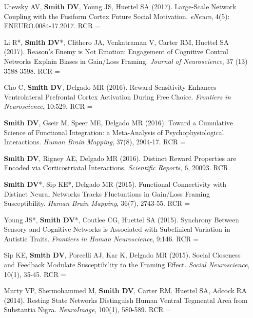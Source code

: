 \documentclass[11pt, letterpaper]{article}
\newcommand{\years}[1]{\marginnote{\scriptsize #1}}
\begin{document}
\begin{hangparas}{.5in}{1}

\years{24.}Utevsky AV, \textbf{Smith DV}, Young JS, Huettel SA (2017). Large-Scale Network Coupling with the Fusiform Cortex Future Social Motivation. \textit{eNeuro}, 4(5): ENEURO.0084-17.2017. RCR = 

\years{23.}Li R*, \textbf{Smith DV}*, Clithero JA, Venkatraman V, Carter RM, Huettel SA (2017). Reason’s Enemy is Not Emotion: Engagement of Cognitive Control Networks Explain Biases in Gain/Loss Framing. \textit{Journal of Neuroscience}, 37 (13) 3588-3598. RCR = 

\years{22.}Cho C, \textbf{Smith DV}, Delgado MR (2016). Reward Sensitivity Enhances Ventrolateral Prefrontal Cortex Activation During Free Choice. \textit{Frontiers in Neuroscience}, 10:529. RCR = 

\years{21.}\textbf{Smith DV}, Gseir M, Speer ME, Delgado MR (2016). Toward a Cumulative Science of Functional Integration: a Meta-Analysis of Psychophysiological Interactions. \textit{Human Brain Mapping}, 37(8), 2904-17. RCR = 

\years{20.}\textbf{Smith DV}, Rigney AE, Delgado MR (2016). Distinct Reward Properties are Encoded via Corticostriatal Interactions. \textit{Scientific Reports}, 6, 20093. RCR = 

\years{19.}\textbf{Smith DV}*, Sip KE*, Delgado MR (2015). Functional Connectivity with Distinct Neural Networks Tracks Fluctuations in Gain/Loss Framing Susceptibility. \textit{Human Brain Mapping}, 36(7), 2743-55. RCR = 

\years{18.}Young JS*, \textbf{Smith DV}*, Coutlee CG, Huettel SA (2015). Synchrony Between Sensory and Cognitive Networks is Associated with Subclinical Variation in Autistic Traits. \textit{Frontiers in Human Neuroscience}, 9:146. RCR = 

\years{17.}Sip KE, \textbf{Smith DV}, Porcelli AJ, Kar K, Delgado MR (2015). Social Closeness and Feedback Modulate Susceptibility to the Framing Effect. \textit{Social Neuroscience}, 10(1), 35-45. RCR = 

\years{16.}Murty VP, Shermohammed M, \textbf{Smith DV}, Carter RM, Huettel SA, Adcock RA (2014). Resting State Networks Distinguish Human Ventral Tegmental Area from Substantia Nigra. \textit{NeuroImage}, 100(1), 580-589. RCR = 


\end{hangparas}
\end{document}
